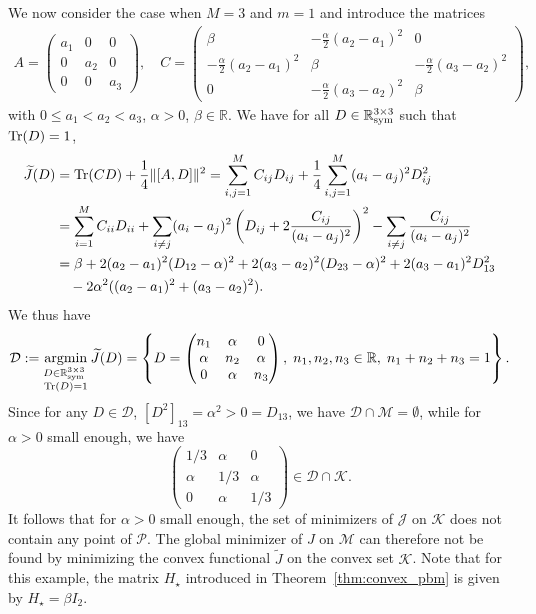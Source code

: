 \documentclass{article}
\def\R{\mathbb R}
\newcommand{\tr}{{\rm Tr}}
\newcommand{\1}{{\mathds 1}}
\begin{document}
\noindent
We now consider the case when $M = 3$ and $m =1$ and introduce the matrices
\begin{align*}
    A = \begin{pmatrix}
        a_1 & 0 &0\\0 & a_2 & 0\\ 0&0&a_3
    \end{pmatrix}, \quad C= \begin{pmatrix}
        \beta & - \frac \alpha2 (a_2 - a_1)^2 & 0 \\ -\frac \alpha2 (a_2 - a_1)^2 & \beta & -\frac \alpha2 (a_3 - a_2)^2\\ 0  & -\frac \alpha2 (a_3 - a_2)^2 & \beta
    \end{pmatrix},
\end{align*}
with $0  \le a_1 < a_2 < a_3$, $\alpha > 0$, $\beta \in \R$. We have for all $D \in \R^{3 \times 3}_{\rm sym}$ such that $\tr(D)=1$,
\begin{align*}
    \widetilde J(D) &= \tr(CD) + \frac 14 \lVert [A,D] \rVert^2 = \sum_{i,j =1}^{M} C_{ij} D_{ij} + \frac 14 \sum_{i,j=1}^{M} (a_i - a_j)^2 D_{ij}^2 \\  &=\sum_{i = 1}^{M}C_{ii}D_{ii}  + \sum_{i \neq j}(a_i - a_j)^2 \left( D_{ij} + 2 \frac{C_{ij}}{(a_i - a_j)^2} \right)^2 - \sum_{i\neq j }
\frac{C_{ij}}{(a_i - a_j)^2} \\
&= \beta + 2 (a_2 - a_1)^2 (D_{12}-\alpha)^2 + 2 (a_3 - a_2)^2 (D_{23}-\alpha)^2 + 2(a_3-a_1)^2 D_{13}^2 \\ & \quad - 2\alpha^2 ((a_2 - a_1)^2+(a_3 - a_2)^2).
\end{align*}
We thus have 
$$
\mathcal D:= \mathop{\rm argmin}_{\substack{ D \in \R^{3 \times 3}_{\rm sym} \; \\ \tr(D)=1}} \widetilde J(D) = \left\{     D = \begin{pmatrix}
        n_1 & \alpha& 0 \\ \alpha&n_2&\alpha\\0&\alpha &n_3
    \end{pmatrix}, \; n_1,n_2,n_3 \in \R, \; n_1+n_2+n_3=1 \right\}.
$$
Since for any $D \in \mathcal D$, $[D^2]_{13}=\alpha^2 > 0 = D_{13}$, we have $\mathcal D \cap \mathcal M = \emptyset$, while for $\alpha > 0$ small enough, we have
$$
 \begin{pmatrix}
        1/3 & \alpha& 0 \\ \alpha& 1/3 &\alpha\\0&\alpha &1/3
    \end{pmatrix} \in \mathcal D \cap \mathcal K.
$$
It follows that for $\alpha > 0$ small enough, the set of minimizers of $\mathcal J$ on $\mathcal K$ does not contain any point of $\mathcal P$. The global minimizer of $J$ on $\mathcal M$ can therefore not be found by minimizing the convex functional $\widetilde J$ on the convex set $\mathcal K$. Note that for this example, the matrix $H_\star$ introduced in Theorem~\ref{thm:convex_pbm} is given by $H_\star=\beta I_2$.
\end{document}
